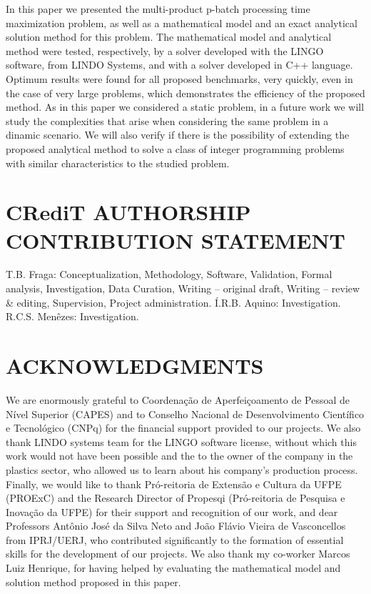 \documentclass[10pt,fleqn,a4paper,twoside]{article}
\begin{document}
In this paper we presented the multi-product p-batch processing time maximization problem, as well as a mathematical model and an exact analytical solution method for this problem. The mathematical model and analytical method were tested, respectively, by a solver developed with the LINGO software, from LINDO Systems, and with a solver developed in C++ language. Optimum results were found for all proposed benchmarks, very quickly, even in the case of very large problems, which demonstrates the efficiency of the proposed method. As in this paper we considered a static problem, in a future work we will study the complexities that arise when considering the same problem in a dinamic scenario. We will also verify if there is the possibility of extending the proposed analytical method to solve a class of integer programming problems with similar characteristics to the studied problem.

\section{CRediT AUTHORSHIP CONTRIBUTION STATEMENT} 
\label{sec:contributions}

T.B. Fraga: Conceptualization, Methodology, Software, Validation, Formal analysis, Investigation, Data Curation, Writing – original draft, Writing – review \& editing, Supervision, Project administration. Í.R.B. Aquino: Investigation. R.C.S. Menêzes: Investigation.

\section{ACKNOWLEDGMENTS}
\label{sec:acknowledgments}

We are enormously grateful to Coordenação de Aperfeiçoamento de Pessoal de Nível Superior (CAPES) and to Conselho Nacional de Desenvolvimento Científico e Tecnológico (CNPq) for the financial support provided to our projects. We also thank LINDO systems team for the LINGO software license, without which this work would not have been possible and the to the owner of the company in the plastics sector, who allowed us to learn about his company's production process. Finally, we would like to thank Pró-reitoria de Extensão e Cultura da UFPE (PROExC) and the Research Director of Propesqi (Pró-reitoria de Pesquisa e Inovação da UFPE) for their support and recognition of our work, and dear Professors Antônio José da Silva Neto and João Flávio Vieira de Vasconcellos from IPRJ/UERJ, who contributed significantly to the formation of essential skills for the development of our projects. We also thank my co-worker Marcos Luiz Henrique, for having helped by evaluating the mathematical model and solution method proposed in this paper.
\end{document}
